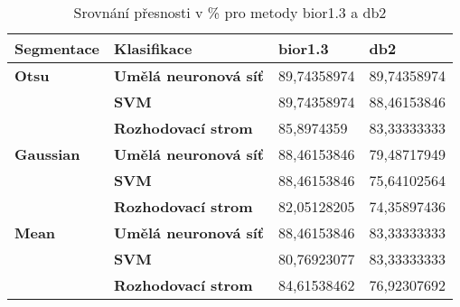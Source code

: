 \capstartfalse
\begin{table}[!htbp]
\begin{tabular}{|l|l|l|l|}
\hline
\textbf{Segmentace} & \textbf{Klasifikace}         & \textbf{bior1.3} & \textbf{db2} \\ \hline
\textbf{Otsu}       & \textbf{Umělá neuronová síť} & 89,74358974      & 89,74358974  \\ \hline
\textbf{}           & \textbf{SVM}                 & 89,74358974      & 88,46153846  \\ \hline
\textbf{}           & \textbf{Rozhodovací strom}   & 85,8974359       & 83,33333333  \\ \hline
\textbf{Gaussian}   & \textbf{Umělá neuronová síť} & 88,46153846      & 79,48717949  \\ \hline
\textbf{}           & \textbf{SVM}                 & 88,46153846      & 75,64102564  \\ \hline
\textbf{}           & \textbf{Rozhodovací strom}   & 82,05128205      & 74,35897436  \\ \hline
\textbf{Mean}       & \textbf{Umělá neuronová síť} & 88,46153846      & 83,33333333  \\ \hline
\textbf{}           & \textbf{SVM}                 & 80,76923077      & 83,33333333  \\ \hline
\textbf{}           & \textbf{Rozhodovací strom}   & 84,61538462      & 76,92307692  \\ \hline
\end{tabular}
\caption{Srovnání přesnosti v \% pro metody bior1.3 a db2 }
\end{table}
\capstarttrue


